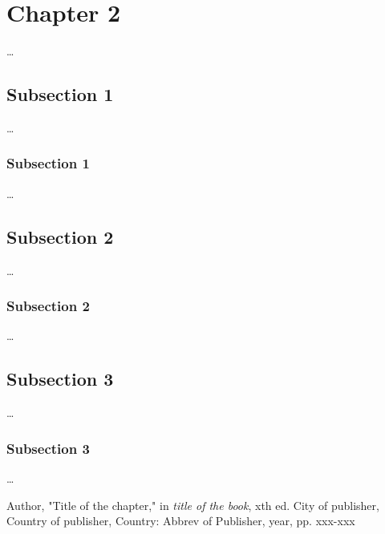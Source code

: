 \documentclass[10pt, a4paper, oneside]{report}
\begin{document}
\chapter{Chapter 2}
\ldots
\section{Subsection 1}
\ldots
\subsection{Subsection 1}
\ldots

\section{Subsection 2}
\ldots
\subsection{Subsection 2}
\ldots

\section{Subsection 3}
\ldots
\subsection{Subsection 3}
\ldots
      
\begin{thebibliography}{9}

  Author,
  "Title of the chapter," in 
  \emph{title of the book},
  xth ed.
  City of publisher,
  Country of publisher,
  Country:
  Abbrev of Publisher,
  year,
  pp. xxx-xxx

\end{thebibliography}      
      
\end{document}
